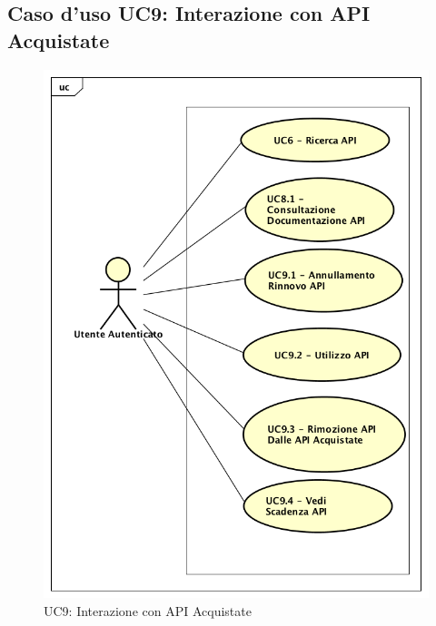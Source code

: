 \newpage
\subsection{Caso d'uso UC9: Interazione con API Acquistate}
\label{UC9}
\begin{figure}[ht]
	\centering
	\includegraphics[scale=0.45]{UML/UC9.png}
	\caption{UC9: Interazione con API Acquistate}
\end{figure}
\FloatBarrier
\renewcommand*{\arraystretch}{1.6}
